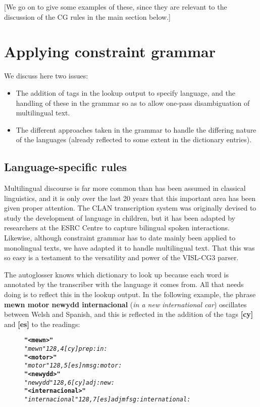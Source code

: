 \documentclass[11pt]{article}
\begin{document}
[We go on to give some examples of these, since they are relevant to the discussion of the CG rules in the main section below.]

\section{Applying constraint grammar}
\label{sec:constraint}

We discuss here two issues:
\begin{itemize}
\item The addition of tags in the lookup output to specify language, and the handling of these in the grammar so as to allow one-pass disambiguation of multilingual text.
\item The different approaches taken in the grammar to handle the differing nature of the languages (already reflected to some extent in the dictionary entries).
\end{itemize}

\subsection{Language-specific rules}
\label{sec:langspec}

Multilingual discourse is far more common than has been assumed in classical linguistics, and it is only over the last 20 years that this important area has been given proper attention.  The CLAN transcription system was originally devised to study the development of language in children, but it has been adapted by researchers at the ESRC Centre to capture bilingual spoken interactions.  Likewise, although constraint grammar has to date mainly been applied to monolingual texts, we have adapted it to handle multilingual text.  That this was so easy is a testament to the versatility and power of the VISL-CG3 parser.

The autoglosser knows which dictionary to look up because each word is annotated by the transcriber with the language it comes from.  All that needs doing is to reflect this in the lookup output.  In the following example, the phrase \textbf{mewn motor newydd internacional} (\textit{in a new international car}) oscillates between Welsh and Spanish, and this is reflected in the addition of the tags \textbf{[cy]} and \textbf{[es]} to the readings:

\begin{figure}[!htbp]
\vspace{-10pt}
\begin{alltt}
\normalfont
\textbf{"<mewn>"}
    \textit{"mewn" {128,4} [cy] prep :in:}
\textbf{"<motor>"}
    \textit{"motor" {128,5} [es] n m sg :motor:}
\textbf{"<newydd>"}
    \textit{"newydd" {128,6} [cy] adj :new:}
\textbf{"<internacional>"}
    \textit{"internacional" {128,7} [es] adj mf sg :internat\-ional:}
\end{alltt}
\vspace{-10pt}
\end{figure}
\end{document}
